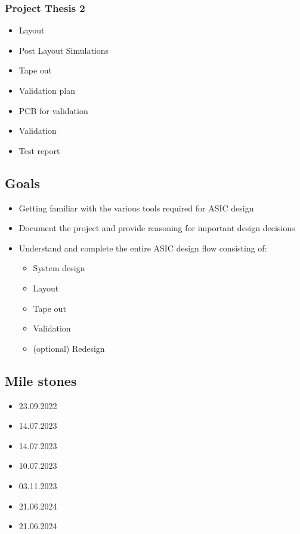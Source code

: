 \subsubsection{Project Thesis 2}
\begin{itemize}
	\item Layout
	\item Post Layout Simulations
	\item Tape out
	\item Validation plan
	\item PCB for validation
	\item Validation
	\item Test report
\end{itemize}
\subsection{Goals}
\begin{itemize}
	\item Getting familiar with the various tools required for \ac{ASIC} design
	\item Document the project and provide reasoning for important design decisions
	\item Understand and complete the entire \ac{ASIC} design flow consisting of:
	\begin{itemize}
		\item System design
		\item Layout
		\item Tape out
		\item Validation
		\item (optional) Redesign
	\end{itemize}
\end{itemize}
\subsection{Mile stones}
\begin{itemize}
	\item {23.09.2022}
	\item {14.07.2023}
	\item {14.07.2023}
	\item {10.07.2023}
	\item {03.11.2023}
	\item {21.06.2024}
	\item {21.06.2024}
\end{itemize}

